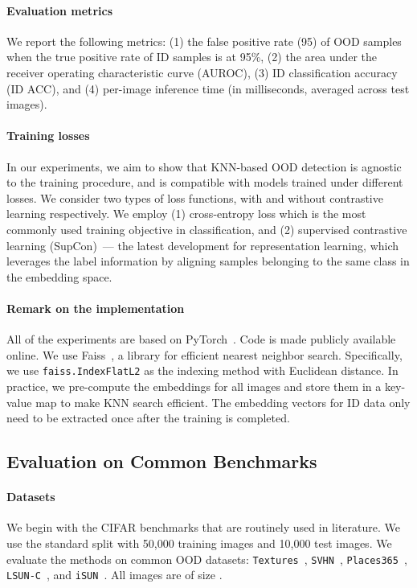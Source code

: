 \documentclass[nohyperref]{article}
\theoremstyle{plain}
\theoremstyle{definition}
\theoremstyle{remark}
\begin{document}
\vspace{-0.3cm}
\paragraph{Evaluation metrics} 
We report the following metrics: (1) the false positive rate (95) of OOD samples when the true positive rate of ID samples is at 95\%, (2) the area under the receiver operating characteristic curve (AUROC), (3) ID classification accuracy (ID ACC), and (4) per-image inference time (in milliseconds, averaged across test images).

\vspace{-0.3cm}
\paragraph{Training losses} In our experiments, we aim to show that KNN-based OOD detection is agnostic to the training procedure, and is compatible with models trained under different losses. We consider two types of loss functions, with and without contrastive learning respectively. We employ (1) cross-entropy loss which is the most commonly used training objective in classification, and (2) supervised contrastive learning (SupCon)~\citep{2020supcon}--- the latest development for representation learning, which leverages the label information by aligning samples belonging to the same class in the embedding space. 

\vspace{-0.3cm}
\paragraph{Remark on the implementation} 
All of the experiments are
based on PyTorch~\citep{pytorch}. Code is made publicly available online. We use Faiss~\citep{faiss}, a library for efficient nearest neighbor search. Specifically, we use \texttt{faiss.IndexFlatL2} as the indexing method with Euclidean distance. In practice, we pre-compute the embeddings for all images and store
them in a key-value map to make KNN search efficient. The embedding vectors for ID data only need to be extracted once after the training is completed. 

\subsection{Evaluation on Common Benchmarks}
\label{sec:common_benchmark}


\paragraph{Datasets}
We begin with the CIFAR benchmarks that are routinely used in literature. We use the standard split with 50,000 training images and 10,000 test images. We evaluate the methods on common OOD datasets: \texttt{Textures}~\citep{cimpoi2014describing}, \texttt{SVHN}~\citep{netzer2011reading}, \texttt{Places365}~\citep{zhou2017places}, \texttt{LSUN-C}~\citep{yu2015lsun}, and \texttt{iSUN}~\citep{xu2015turkergaze}. All images are of size .
\end{document}
